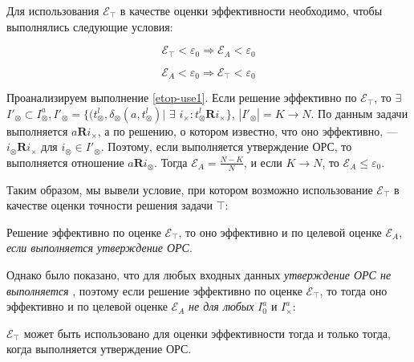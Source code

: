 Для использования $\mathcal{E}_{\top}$ в качестве
оценки эффективности необходимо, чтобы выполнялись следующие условия:

\begin{equation}\label{etop-use1}
\mathcal{E}_{\top} < \varepsilon_0 \Rightarrow \mathcal{E}_A < \varepsilon_0
\end{equation}

\begin{equation}\label{etop-use2}
\mathcal{E}_A < \varepsilon_0 \Rightarrow \mathcal{E}_{\top} < \varepsilon_0 
\end{equation}

Проанализируем выполнение \ref{etop-use1}. Если решение эффективно по $\mathcal{E}_{\top}$, то 
$\exists$ $I'_{\otimes} \subset I^a_{\otimes}, I'_{\otimes} = \{ (t^l_{\otimes}, \delta_{\otimes}(a, t^l_{\otimes}) |$ $\exists$ $i_{\times}: t^l_{\otimes} \mathbf{R} i_{\times} \}$, 
$|I'_{\otimes}| = K \rightarrow N$. По данным задачи выполняется $a \mathbf{R} i_{\times}$, а по решению, о котором известно, что оно эффективно, --- 
$i_{\otimes} \mathbf{R} i_{\times}$ для $i_{\otimes} \in I'_{\otimes}$. Поэтому, если выполняется утверждение ОРС, то выполняется отношение 
$a \mathbf{R} i_{\otimes}$. Тогда $\mathcal{E}_A = \frac{N - K}{N}$, и если $K \rightarrow N$, то $\mathcal{E}_A \le \varepsilon_0$.

Таким образом, мы вывели условие, при котором возможно использование $\mathcal{E}_{\top}$ в качестве оценки точности решения задачи $\top$:
\begin{assert}
Решение эффективно по оценке $\mathcal{E}_{\top}$, то оно эффективно и по целевой оценке $\mathcal{E}_A$, {\it если выполняется утверждение ОРС}.
\end{assert}

Однако было показано, что для любых входных данных {\it утверждение ОРС не выполняется }, поэтому 
если решение эффективно по оценке $\mathcal{E}_{\top}$, то тогда оно эффективно и по целевой оценке $\mathcal{E}_A$ {\it не для любых} $I^a_{0}$ и
$I^a_{\times}$:

\begin{assert}
$\mathcal{E}_{\top}$ может быть использовано для оценки эффективности тогда и только тогда, когда выполняется утверждение ОРС.
\end{assert}

